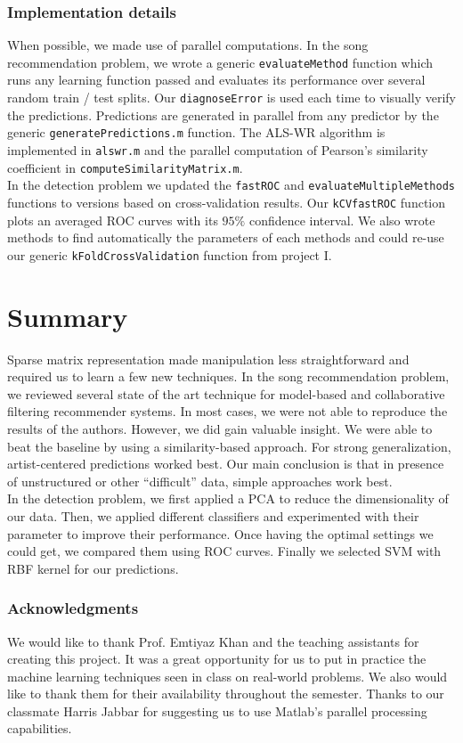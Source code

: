 \documentclass[10pt,a4paper]{article}
\begin{document}
 \subsubsection*{Implementation details}
  When possible, we made use of parallel computations. In the song recommendation problem, we wrote a generic \texttt{evaluateMethod} function which runs any learning function passed and evaluates its performance over several random train / test splits. Our \texttt{diagnoseError} is used each time to visually verify the predictions. Predictions are generated in parallel from any predictor by the generic \texttt{generatePredictions.m} function. The ALS-WR algorithm is implemented in \texttt{alswr.m} and the parallel computation of Pearson's similarity coefficient in \texttt{computeSimilarityMatrix.m}.\\
  In the detection problem we updated the \texttt{fastROC} and \texttt{evaluateMultipleMethods} functions to versions based on cross-validation results. Our \texttt{kCVfastROC} function plots an averaged ROC curves with its $95\%$ confidence interval. We also wrote methods to find automatically the parameters of each methods and could re-use our generic \texttt{kFoldCrossValidation} function from project I.

\section{Summary}
  Sparse matrix representation made manipulation less straightforward and required us to learn a few new techniques.
  In the song recommendation problem, we reviewed several state of the art technique for model-based and collaborative filtering recommender systems. In most cases, we were not able to reproduce the results of the authors. However, we did gain valuable insight. We were able to beat the baseline by using a similarity-based approach. For strong generalization, artist-centered predictions worked best. Our main conclusion is that in presence of unstructured or other ``difficult'' data, simple approaches work best.\\
  In the detection problem, we first applied a PCA to reduce the dimensionality of our data. Then, we applied different classifiers and experimented with their parameter to improve their performance. Once having the optimal settings we could get, we compared them using ROC curves. Finally we selected SVM with RBF kernel for our predictions.

    \subsubsection*{Acknowledgments}
    We would like to thank Prof. Emtiyaz Khan and the teaching assistants for creating this project. It was a great opportunity for us to put in practice the machine learning techniques seen in class on real-world problems. We also would like to thank them for their availability throughout the semester. Thanks to our classmate Harris Jabbar for suggesting us to use Matlab's parallel processing capabilities.\\
\end{document}
